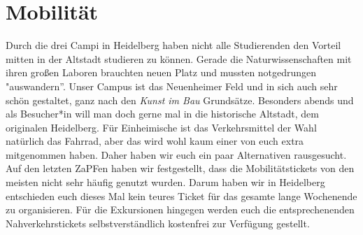 \section{Mobilität}
  Durch die drei Campi in Heidelberg haben nicht alle Studierenden den Vorteil mitten
  in der Altstadt studieren zu können. Gerade die Naturwissenschaften mit ihren großen
  Laboren brauchten neuen Platz und mussten notgedrungen "auswandern''. Unser Campus ist
  das Neuenheimer Feld und in sich auch sehr schön gestaltet, ganz nach den \textit{Kunst im Bau} Grundsätze.
Besonders abends und als Besucher*in will man doch gerne mal in die historische Altstadt, dem originalen Heidelberg.
  Für Einheimische ist das Verkehrsmittel der Wahl natürlich das Fahrrad, aber das wird wohl
  kaum einer von euch extra mitgenommen haben. Daher haben wir euch ein paar Alternativen
  rausgesucht. Auf den letzten ZaPFen haben wir festgestellt, dass die Mobilitätstickets von den meisten nicht sehr häufig genutzt wurden. Darum haben wir in Heidelberg entschieden euch
  dieses Mal kein teures Ticket für das gesamte lange Wochenende zu organisieren.
Für die Exkursionen hingegen werden euch die entsprechenenden Nahverkehrstickets selbstverständlich kostenfrei zur Verfügung gestellt.

